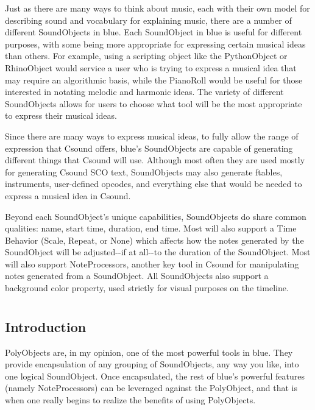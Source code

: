 Just as there are many ways to think about music, each with their own
model for describing sound and vocabulary for explaining music, there
are a number of different SoundObjects in blue. Each SoundObject in blue
is useful for different purposes, with some being more appropriate for
expressing certain musical ideas than others. For example, using a
scripting object like the PythonObject or RhinoObject would service a
user who is trying to express a musical idea that may require an
algorithmic basis, while the PianoRoll would be useful for those
interested in notating melodic and harmonic ideas. The variety of
different SoundObjects allows for users to choose what tool will be the
most appropriate to express their musical ideas.

Since there are many ways to express musical ideas, to fully allow the
range of expression that Csound offers, blue's SoundObjects are capable
of generating different things that Csound will use. Although most often
they are used mostly for generating Csound SCO text, SoundObjects may
also generate ftables, instruments, user-defined opcodes, and everything
else that would be needed to express a musical idea in Csound.

Beyond each SoundObject's unique capabilities, SoundObjects do share
common qualities: name, start time, duration, end time. Most will also
support a Time Behavior (Scale, Repeat, or None) which affects how the
notes generated by the SoundObject will be adjusted-\/-if at all-\/-to
the duration of the SoundObject. Most will also support NoteProcessors,
another key tool in Csound for manipulating notes generated from a
SoundObject. All SoundObjects also support a background color property,
used strictly for visual purposes on the timeline.

\section{}\label{conceptsPolyObjects}

\subsection{Introduction}

PolyObjects are, in my opinion, one of the most powerful tools in blue.
They provide encapsulation of any grouping of SoundObjects, any way you
like, into one logical SoundObject. Once encapsulated, the rest of
blue's powerful features (namely NoteProcessors) can be leveraged
against the PolyObject, and that is when one really begins to realize
the benefits of using PolyObjects.

